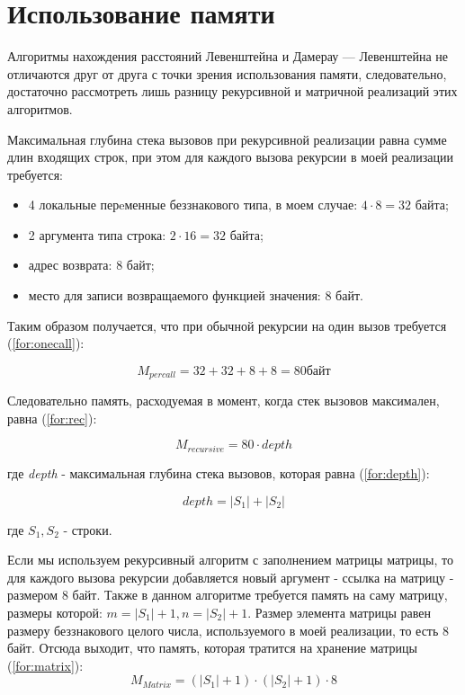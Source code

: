 \section{Использование памяти}

Алгоритмы нахождения расстояний Левенштейна и Дамерау — Левенштейна не отличаются друг от друга с точки зрения использования памяти, следовательно, достаточно рассмотреть лишь разницу рекурсивной и матричной реализаций этих алгоритмов.

Максимальная глубина стека вызовов при рекурсивной реализации равна сумме длин входящих строк, при этом для каждого вызова рекурсии в моей реализации требуется:
\begin{itemize}
    \item 4 локальные перeменные беззнакового типа, в моем случае: $4 \cdot 8 = 32$ байта;
    \item 2 аргумента типа строка: $2 \cdot 16 = 32$ байта;
    \item адрес возврата: 8 байт;
    \item место для записи возвращаемого функцией значения: 8 байт.
\end{itemize}
Таким образом получается, что при обычной рекурсии на один вызов требуется (\ref{for:onecall}): 

\begin{equation}
M_{per call} = 32 + 32 + 8 + 8 = 80 байт
\label{for:onecall}
\end{equation}

Следовательно память, расходуемая в момент, когда стек вызовов максимален, равна (\ref{for:rec}): 

\begin{equation}
    M_{recursive} = 80 \cdot depth
\label{for:rec}
\end{equation}

где \textit{depth} - максимальная глубина стека вызовов, которая равна (\ref{for:depth}):

\begin{equation}
depth = |S_1| + |S_2|
\label{for:depth}
\end{equation}

где $S_1, S_2$ - строки.

Если мы используем рекурсивный алгоритм с заполнением матрицы матрицы, то для каждого вызова рекурсии добавляется новый аргумент - ссылка на матрицу - размером $8$ байт. Также в данном алгоритме требуется память на саму матрицу, размеры которой: $m = |S_1| + 1, n = |S_2| + 1$. Размер элемента матрицы равен размеру беззнакового целого числа, используемого в моей реализации, то есть $8$ байт. Отсюда выходит, что память, которая тратится на хранение матрицы (\ref{for:matrix}):
\begin{equation}
M_{Matrix} = (|S_1| + 1) \cdot (|S_2| + 1) \cdot 8
\label{for:matrix}
\end{equation}

